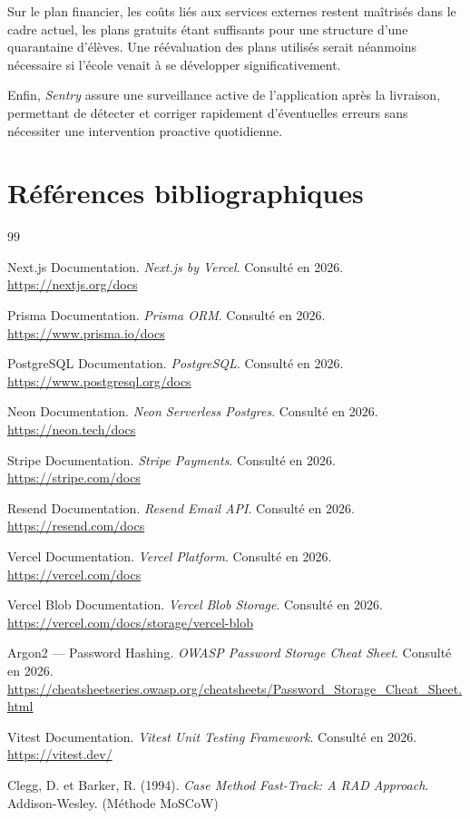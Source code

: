 \documentclass{article}
\begin{document}
Sur le plan financier, les coûts liés aux services externes 
restent maîtrisés dans le cadre actuel, les plans gratuits 
étant suffisants pour une structure d'une quarantaine d'élèves. 
Une réévaluation des plans utilisés serait néanmoins nécessaire 
si l'école venait à se développer significativement.

Enfin, \textit{Sentry} assure une surveillance active de 
l'application après la livraison, permettant de détecter et 
corriger rapidement d'éventuelles erreurs sans nécessiter 
une intervention proactive quotidienne.

\section*{Références bibliographiques}
\begin{thebibliography}{99}

Next.js Documentation. \textit{Next.js by Vercel}.
Consulté en 2026. \url{https://nextjs.org/docs}

Prisma Documentation. \textit{Prisma ORM}.
Consulté en 2026. \url{https://www.prisma.io/docs}

PostgreSQL Documentation. \textit{PostgreSQL}.
Consulté en 2026. \url{https://www.postgresql.org/docs}

Neon Documentation. \textit{Neon Serverless Postgres}.
Consulté en 2026. \url{https://neon.tech/docs}

Stripe Documentation. \textit{Stripe Payments}.
Consulté en 2026. \url{https://stripe.com/docs}

Resend Documentation. \textit{Resend Email API}.
Consulté en 2026. \url{https://resend.com/docs}

Vercel Documentation. \textit{Vercel Platform}.
Consulté en 2026. \url{https://vercel.com/docs}

Vercel Blob Documentation. \textit{Vercel Blob Storage}.
Consulté en 2026. \url{https://vercel.com/docs/storage/vercel-blob}

Argon2 — Password Hashing. \textit{OWASP Password Storage Cheat Sheet}.
Consulté en 2026. \url{https://cheatsheetseries.owasp.org/cheatsheets/Password_Storage_Cheat_Sheet.html}

Vitest Documentation. \textit{Vitest Unit Testing Framework}.
Consulté en 2026. \url{https://vitest.dev/}

Clegg, D. et Barker, R. (1994). \textit{Case Method Fast-Track: A RAD Approach}.
Addison-Wesley. (Méthode MoSCoW)


\end{thebibliography}
\end{document}
